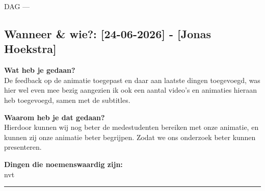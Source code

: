 DAG ---

\subsection*{Wanneer \& wie?: [24-06-2026] - [Jonas Hoekstra]}

\textbf{Wat heb je gedaan?}\\
De feedback op de animatie toegepast en daar aan laatste dingen toegevoegd, was hier wel even mee bezig aangezien ik ook een aantal video's en animaties hieraan heb toegevoegd, samen met de subtitles. 
\vspace{0.3cm} 

\noindent \textbf{Waarom heb je dat gedaan?}\\
Hierdoor kunnen wij nog beter de medestudenten bereiken met onze animatie, en kunnen zij onze animatie beter begrijpen. Zodat we ons onderzoek beter kunnen presenteren.

\noindent \textbf{Dingen die noemenswaardig zijn:}\\
nvt 

\vspace{0.5cm}
\hrule 
\vspace{0.5cm}
